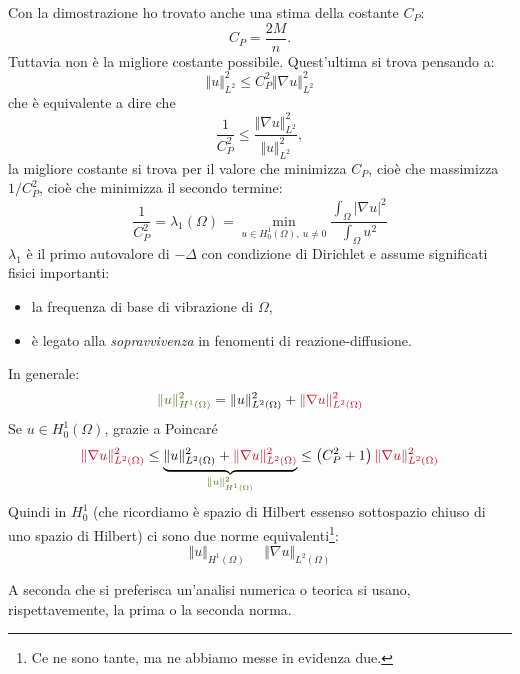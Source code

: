\begin{oss}
    Con la dimostrazione ho trovato anche una stima della costante $\displaystyle C_{P}$:
    \begin{equation*}
        C_{P} =\frac{2M}{n} .
    \end{equation*}
    Tuttavia non è la migliore costante possibile. Quest'ultima si trova pensando a:
    \begin{equation*}
        \Vert u\Vert _{L^{2}}^{2} \leqslant C_{P}^{2}\Vert \nabla u\Vert _{L^{2}}^{2}
    \end{equation*}
    che è equivalente a dire che
    \begin{equation*}
        \frac{1}{C_{P}^{2}} \leqslant \frac{\Vert \nabla u\Vert _{L^{2}}^{2}}{\Vert u\Vert _{L^{2}}^{2}} ,
    \end{equation*}
    la migliore costante si trova per il valore che minimizza $\displaystyle C_{P}$, cioè che massimizza $\displaystyle 1/C_{P}^{2}$, cioè che minimizza il secondo termine:
    \begin{equation}
        \frac{1}{C_{P}^{2}} =\lambda _{1}(\Omega) =\min_{u\in H_{0}^{1}(\Omega) ,\ u\neq 0}\frac{\int _{\Omega }| \nabla u| ^{2}}{\int _{\Omega } u^{2}}
    \end{equation}
    $\displaystyle \lambda _{1}$ è il primo autovalore di $\displaystyle -\Delta $ con condizione di Dirichlet e assume significati fisici importanti:
    \begin{itemize}
        \item la frequenza di base di vibrazione di $\displaystyle \Omega $,
        \item è legato alla \textit{sopravvivenza} in fenomenti di reazione-diffusione.
    \end{itemize}
\end{oss}
\begin{oss}
    In generale:
    \begin{equation*}
        \textcolor[rgb]{0.25,0.46,0.02}{\Vert u\Vert _{H^{1}(\Omega)}^{2}} =\Vert u\Vert _{L^{2}(\Omega)}^{2} +\textcolor[rgb]{0.82,0.01,0.11}{\Vert \nabla u\Vert _{L^{2}(\Omega)}^{2}}
    \end{equation*}
    Se $\displaystyle u\in H_{0}^{1}(\Omega)$, grazie a Poincaré
    \begin{equation}
        \textcolor[rgb]{0.82,0.01,0.11}{\Vert \nabla u\Vert _{L^{2}(\Omega)}^{2}} \leqslant \underbrace{\Vert u\Vert _{L^{2}(\Omega)}^{2} +\textcolor[rgb]{0.82,0.01,0.11}{\Vert \nabla u\Vert _{L^{2}(\Omega)}^{2}}}_{\textcolor[rgb]{0.25,0.46,0.02}{\Vert u\Vert _{H^{1}(\Omega)}^{2}}} \leqslant \left(C_{P}^{2} +1\right)\textcolor[rgb]{0.82,0.01,0.11}{\Vert \nabla u\Vert _{L^{2}(\Omega)}^{2}}
        \label{eq:af-stima-poincare}
    \end{equation}
    Quindi in $\displaystyle H_{0}^{1}$ (che ricordiamo è spazio di Hilbert essenso sottospazio chiuso di uno spazio di Hilbert) ci sono due norme equivalenti\footnote{Ce ne sono tante, ma ne abbiamo messe in evidenza due.}:
    \begin{equation*}
        \Vert u\Vert _{H^{1}(\Omega)} \ \ \ \ \ \ \Vert \nabla u\Vert _{L^{2}(\Omega)}
    \end{equation*}
\end{oss}
A seconda che si preferisca un'analisi numerica o teorica si usano, rispettavemente, la prima o la seconda norma.